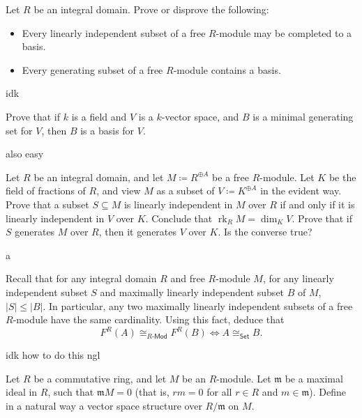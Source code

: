 \documentclass[11pt]{report}
\DeclareMathOperator{\rank}{rk}
\newcommand{\Rmod}[1]{#1\text{-}\mathsf{Mod}}
\begin{document}
\begin{exercise}
	Let $R$ be an integral domain. Prove or disprove the following:
	\begin{itemize}
		\item Every linearly independent subset of a free $R$-module may be completed to a basis.
		\item Every generating subset of a free $R$-module contains a basis.
	\end{itemize}
\end{exercise}
\begin{solution}
	idk
\end{solution}
\begin{exercise}
	Prove that if $k$ is a field and $V$ is a $k$-vector space, and $B$ is a minimal generating set for $V$, then $B$ is a basis for $V$.
\end{exercise}
\begin{solution}
	also easy
\end{solution}
\begin{exercise}
	Let $R$ be an integral domain, and let $M\coloneqq R^{\oplus A} $ be a free $R$-module. Let $K$ be the field of fractions of $R$, and view $M$ as a subset of $V\coloneqq K^{\oplus A} $ in the evident way. Prove that a subset $S\subseteq M$ is linearly independent in $M$ over $R$ if and only if it is linearly independent in $V$ over $K$. Conclude that $\rank_R M=\dim_K V$. Prove that if $S$ generates $M$ over $R$, then it generates $V$ over $K$. Is the converse true?
\end{exercise}
\begin{solution}
	a
\end{solution}
\begin{exercise}
	Recall that for any integral domain $R$ and free $R$-module $M$, for any linearly independent subset $S$ and maximally linearly independent subset $B$ of $M$, $\left| S \right| \leq \left| B \right| $. In particular, any two maximally linearly independent subsets of a free $R$-module have the same cardinality. Using this fact, deduce that
	\[
		F^R(A)\cong_{\Rmod{R} } F^R(B)\iff A\cong_{\mathsf{Set} }  B
	.\]
	
\end{exercise}
\begin{solution}
	idk how to do this ngl
\end{solution}
\begin{exercise}
	Let $R$ be a commutative ring, and let $M$ be an $R$-module. Let $\mathfrak{m} $ be a maximal ideal in $R$, such that $\mathfrak{m} M=0$ (that is, $r m=0$ for all $r\in R$ and $m\in \mathfrak{m} $). Define in a natural way a vector space structure over $R/\mathfrak{m} $ on $M$.
\end{exercise}
\end{document}
